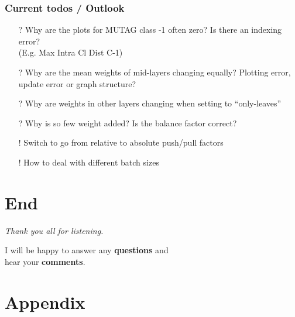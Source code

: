 \begin{frame}
	\frametitle{Current todos / Outlook}
	\begin{itemize}
		\item[?] Why are the plots for MUTAG class -1 often zero? Is there an indexing error?\\
		(E.g. Max Intra Cl Dist C-1)
		\item[?] Why are the mean weights of mid-layers changing equally? Plotting error, update error or graph structure?
		\item[?] Why are weights in other layers changing when setting to \enquote{only-leaves}
		\item[?] Why is so few weight added? Is the balance factor correct?
		\item[!] Switch to go from relative to absolute push/pull factors
		\item[!] How to deal with different batch sizes
	\end{itemize}
\end{frame}

\section{End}

\begin{frame}[c]
	\centering %
	\begin{huge}
		\emph{Thank you all for listening.}\\
	\end{huge}
	\vspace{2 cm}
	I will be happy to answer any \textbf{questions} and\\
	hear your \textbf{comments}.
\end{frame}

\appendix
\section{Appendix}



